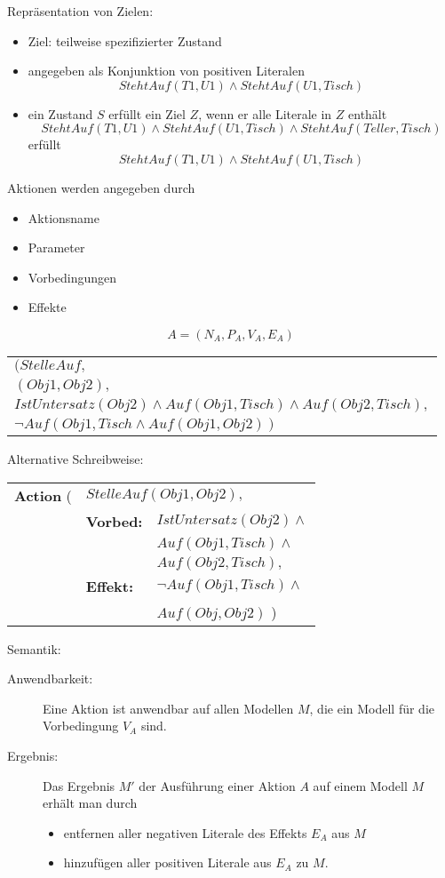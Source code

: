 Repräsentation von Zielen:
\begin{itemize}
\item Ziel: teilweise spezifizierter Zustand
\item angegeben als Konjunktion von positiven Literalen
$$StehtAuf(T1,U1) \wedge StehtAuf(U1,Tisch)$$
\item ein Zustand $S$ erfüllt ein Ziel $Z$, wenn er alle Literale in $Z$ enthält
$$StehtAuf(T1,U1) \wedge StehtAuf(U1,Tisch) \wedge StehtAuf(Teller,Tisch)$$
erfüllt $$StehtAuf(T1,U1) \wedge StehtAuf(U1,Tisch)$$
\end{itemize}
Aktionen werden angegeben durch
\begin{itemize}
\item Aktionsname
\item Parameter
\item Vorbedingungen
\item Effekte
\end{itemize}
$$A = (N_A,P_A,V_A,E_A)$$
\begin{center}
\begin{tabular}{l}
$(StelleAuf,$ \\ $(Obj1,Obj2),$ \\ $IstUntersatz(Obj2) \wedge Auf(Obj1,Tisch) \wedge Auf(Obj2,Tisch),$ \\ $\neg Auf(Obj1,Tisch \wedge Auf(Obj1,Obj2))$
\end{tabular}
\end{center}
Alternative Schreibweise:
\begin{center}
\begin{tabular}{lll}
\textbf{Action} ( & \multicolumn{2}{l}{$StelleAuf(Obj1, Obj2),$} \\
& \textbf{Vorbed:} & $IstUntersatz(Obj2) \wedge$ \\ && $Auf(Obj1, Tisch) \wedge$ \\ && $Auf(Obj2, Tisch),$ \\
& \textbf{Effekt:} & $\neg Auf(Obj1, Tisch) \wedge$ \\ && $Auf(Obj, Obj2)$ \qquad \quad )
\end{tabular}
\end{center}
Semantik:
\begin{description}
\item[Anwendbarkeit:] Eine Aktion ist anwendbar auf allen Modellen $M$, die ein Modell für die Vorbedingung $V_A$ sind.
\item[Ergebnis:] Das Ergebnis $M'$ der Ausführung einer Aktion $A$ auf einem Modell $M$ erhält man durch
\begin{itemize}
\item entfernen aller negativen Literale des Effekts $E_A$ aus $M$
\item hinzufügen aller positiven Literale aus $E_A$ zu $M$.
\end{itemize}
\end{description}
